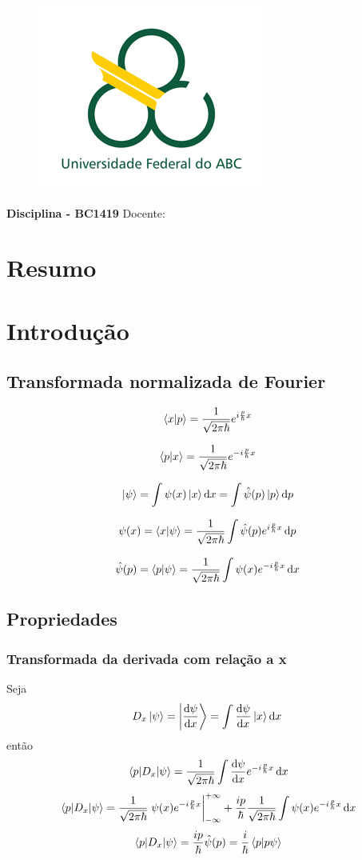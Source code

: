 \documentclass[report,14pt,openright,oneside,a4paper,brazil]{abntex2}
\date{Data}
\newcommand{\abrir}[2]{\int{#1}\ket{#2}\dd{#2}}
\newcommand{\qfourier}[1]{\frac{1}{\sqrt{2\pi\hbar}}\int{#1} e^{-i \frac{p}{\hbar} x} \dd{x}}
\newcommand{\aqfourier}[1]{\frac{1}{\sqrt{2\pi\hbar}}\int{#1} e^{i \frac{p}{\hbar} x} \dd{p}}
\renewcommand{\imprimircapa}{%
\begin{capa}%
	\begin{figure}[ht]
		\centering
		\includegraphics[scale=0.6]{logo.jpg}
		\label{fig:logo}
	\end{figure}
	\begin{center}
		\textbf{\large Disciplina - BC1419}
		\vfill
    	{\LARGE\textbf{\imprimirtitulo}}
    	\vfill
    	Docente: \imprimirorientador
    	\vspace*{1cm}
		\imprimirautor
		\vfill
    	\imprimirlocal \\
    	\imprimirdata
	\end{center}
\end{capa}
}
\begin{document}
\imprimircapa
\tableofcontents

\chapter*{Resumo}


\chapter{Introdução}

\section{Transformada normalizada de Fourier}

\begin{equation}
    \bra{x}\ket{p}=\frac{1}{\sqrt{2\pi\hbar}}e^{i\frac{p}{\hbar}x}
\end{equation}

\begin{equation}
    \bra{p}\ket{x}=\frac{1}{\sqrt{2\pi\hbar}}e^{-i\frac{p}{\hbar}x}
\end{equation}

\begin{equation}
    \ket{\psi}=\abrir{\psi(x)}{x}=\abrir{\hat\psi(p)}{p}
\end{equation}

\begin{equation}
    \psi(x)=\bra{x}\ket{\psi}=\aqfourier{\hat \psi (p)}
\end{equation}

\begin{equation}
    \hat{\psi}(p)=\bra{p}\ket{\psi}=\qfourier{\psi(x)}
\end{equation}

\section{Propriedades}

\subsection{Transformada da derivada com relação a x}

Seja
\begin{equation}
    D_x\ket{\psi}=\ket{\dv{\psi}{x}}= \abrir{\dv{\psi}{x} (x)}{x}
\end{equation}
então
\begin{equation}
    \matrixel{p}{D_x}{\psi}= \qfourier{\dv{\psi}{x} (x)}
\end{equation}
\begin{equation}
    \matrixel{p}{D_x}{\psi}= \frac{1}{\sqrt{2\pi \hbar}}\eval{\psi(x)e^{-i\frac{p}{\hbar}x}}_{-\infty}^{+\infty}+ \frac{ip}{\hbar} \qfourier{\psi(x)}
\end{equation}
\begin{equation}
    \matrixel{p}{D_x}{\psi}= \frac{ip}{\hbar} \hat{\psi}(p)=\frac{i}{\hbar} \braket{p}{p\psi}
\end{equation}
\end{document}
